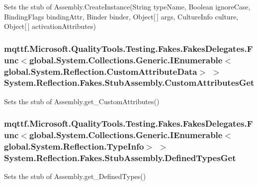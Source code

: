 Sets the stub of Assembly.\-Create\-Instance(\-String type\-Name, Boolean ignore\-Case, Binding\-Flags binding\-Attr, Binder binder, Object\mbox{[}$\,$\mbox{]} args, Culture\-Info culture, Object\mbox{[}$\,$\mbox{]} activation\-Attributes)

\hypertarget{class_system_1_1_reflection_1_1_fakes_1_1_stub_assembly_a4c01ab0f6b0dd6580a83e238a2df5948}{
\subsubsection[{Custom\-Attributes\-Get}]{\setlength{\rightskip}{0pt plus 5cm}mqttf.\-Microsoft.\-Quality\-Tools.\-Testing.\-Fakes.\-Fakes\-Delegates.\-Func$<$global.\-System.\-Collections.\-Generic.\-I\-Enumerable$<$global.\-System.\-Reflection.\-Custom\-Attribute\-Data$>$ $>$ System.\-Reflection.\-Fakes.\-Stub\-Assembly.\-Custom\-Attributes\-Get}}\label{class_system_1_1_reflection_1_1_fakes_1_1_stub_assembly_a4c01ab0f6b0dd6580a83e238a2df5948}


Sets the stub of Assembly.\-get\-\_\-\-Custom\-Attributes()

\hypertarget{class_system_1_1_reflection_1_1_fakes_1_1_stub_assembly_aee0646e0a1f3715bab73aabf364ab5e8}{
\subsubsection[{Defined\-Types\-Get}]{\setlength{\rightskip}{0pt plus 5cm}mqttf.\-Microsoft.\-Quality\-Tools.\-Testing.\-Fakes.\-Fakes\-Delegates.\-Func$<$global.\-System.\-Collections.\-Generic.\-I\-Enumerable$<$global.\-System.\-Reflection.\-Type\-Info$>$ $>$ System.\-Reflection.\-Fakes.\-Stub\-Assembly.\-Defined\-Types\-Get}}\label{class_system_1_1_reflection_1_1_fakes_1_1_stub_assembly_aee0646e0a1f3715bab73aabf364ab5e8}


Sets the stub of Assembly.\-get\-\_\-\-Defined\-Types()

